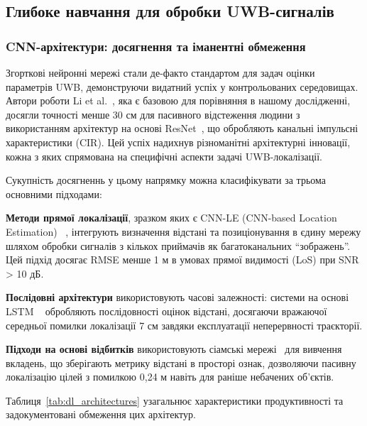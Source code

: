 \documentclass[12pt,a4paper]{article}
\begin{document}
\subsection{Глибоке навчання для обробки UWB-сигналів}

\subsubsection{CNN-архітектури: досягнення та іманентні обмеження}

Згорткові нейронні мережі стали де-факто стандартом для задач оцінки параметрів UWB, демонструючи видатний успіх у контрольованих середовищах. Автори роботи Li et al.~\cite{li2021multi}, яка є базовою для порівняння в нашому дослідженні, досягли точності менше 30 см для пасивного відстеження людини з використанням архітектур на основі ResNet~\cite{he2016deep}, що обробляють канальні імпульсні характеристики (CIR). Цей успіх надихнув різноманітні архітектурні інновації, кожна з яких спрямована на специфічні аспекти задачі UWB-локалізації.

Сукупність досягненнь у цьому напрямку можна класифікувати за трьома основними підходами:

 \textbf{Методи прямої локалізації}, зразком яких є CNN-LE (CNN-based Location Estimation) ~\cite{cnn_le_2020}, інтегрують визначення відстані та позиціонування в єдину мережу шляхом обробки сигналів з кількох приймачів як багатоканальних ``зображень''. Цей підхід досягає RMSE менше 1 м в умовах прямої видимості (LoS) при SNR > 10 дБ.
 
\textbf{Послідовні архітектури} використовують часові залежності: системи на основі LSTM ~\cite{uwb_lstm_2020} обробляють послідовності оцінок відстані, досягаючи вражаючої середньої помилки локалізації 7 см завдяки експлуатації неперервності траєкторії. 

\textbf{Підходи на основі відбитків} використовують сіамські мережі~\cite{zhang2021understanding} для вивчення вкладень, що зберігають метрику відстані в просторі ознак, дозволяючи пасивну локалізацію цілей з помилкою 0,24 м навіть для раніше небачених об'єктів.

Таблиця~\ref{tab:dl_architectures} узагальнює характеристики продуктивності та задокументовані обмеження цих архітектур.
\end{document}
